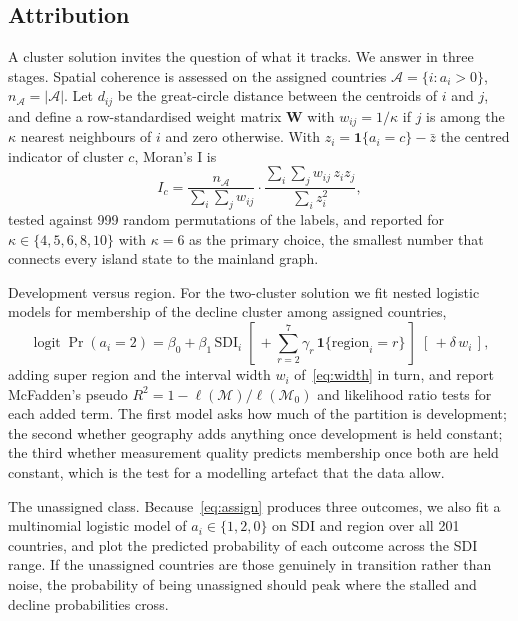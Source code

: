 \documentclass[11pt,a4paper]{article}
\DeclareMathOperator{\logit}{logit}
\begin{document}
\subsection{Attribution}\label{sec:attribution}

A cluster solution invites the question of what it tracks. We answer in three stages. Spatial coherence is assessed on the assigned countries $\mathcal{A} = \{i : a_i > 0\}$, $n_{\mathcal{A}} = |\mathcal{A}|$. Let $d_{ij}$ be the great-circle distance between the centroids of $i$ and $j$, and define a row-standardised weight matrix $\mathbf{W}$ with $w_{ij} = 1/\kappa$ if $j$ is among the $\kappa$ nearest neighbours of $i$ and zero otherwise. With $z_i = \mathbf{1}\{a_i = c\} - \bar z$ the centred indicator of cluster $c$, Moran's I \citep{moran1950} is
\begin{equation}\label{eq:moran}
I_c = \frac{n_{\mathcal{A}}}{\sum_i \sum_j w_{ij}} \cdot \frac{\sum_i \sum_j w_{ij}\, z_i z_j}{\sum_i z_i^2},
\end{equation}
tested against 999 random permutations of the labels, and reported for $\kappa \in \{4, 5, 6, 8, 10\}$ with $\kappa = 6$ as the primary choice, the smallest number that connects every island state to the mainland graph.

Development versus region. For the two-cluster solution we fit nested logistic models for membership of the decline cluster among assigned countries,
\begin{equation}\label{eq:logit}
\logit \Pr(a_i = 2) = \beta_0 + \beta_1\,\mathrm{SDI}_i \;[\,+ \textstyle\sum_{r=2}^{7} \gamma_r\,\mathbf{1}\{\mathrm{region}_i = r\}\,] \;[\,+ \delta\, w_i\,],
\end{equation}
adding super region and the interval width $w_i$ of~\eqref{eq:width} in turn, and report McFadden's pseudo $R^2 = 1 - \ell(\mathcal{M})/\ell(\mathcal{M}_0)$ and likelihood ratio tests for each added term. The first model asks how much of the partition is development; the second whether geography adds anything once development is held constant; the third whether measurement quality predicts membership once both are held constant, which is the test for a modelling artefact that the data allow.

The unassigned class. Because~\eqref{eq:assign} produces three outcomes, we also fit a multinomial logistic model of $a_i \in \{1, 2, 0\}$ on SDI and region over all 201 countries, and plot the predicted probability of each outcome across the SDI range. If the unassigned countries are those genuinely in transition rather than noise, the probability of being unassigned should peak where the stalled and decline probabilities cross.
\end{document}
